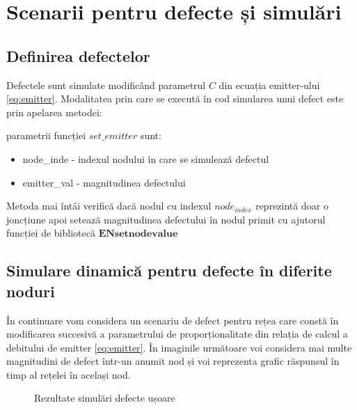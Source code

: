 \chapter{Scenarii pentru defecte și simulări}
\label{chap:detectie}
\section{Definirea defectelor}
Defectele sunt simulate modificând parametrul $C$ din ecuația emitter-ului \eqref{eq:emitter}. Modalitatea prin care se execută în cod simularea unui defect este prin apelarea metodei:



parametrii funcției $set\_emitter$ sunt:
\begin{itemize}
\item node\_inde - indexul nodului în care se simulează defectul
\item emitter\_val - magnitudinea defectului
\end{itemize}

Metoda mai întâi verifică dacă nodul cu indexul $node_{index}$ reprezintă doar o joncțiune apoi setează magnitudinea defectului în nodul primit cu ajutorul funcției de bibliotecă $\mathbf{ENsetnodevalue}$ 

\section{Simulare dinamică pentru defecte în diferite noduri}

În continuare vom considera un scenariu de defect pentru rețea care constă în modificarea succesivă a parametrului de proporționalitate din relația de calcul a debitului de emitter \eqref{eq:emitter}. În imaginile următoare voi considera mai multe magnitudini de defect într-un anumit nod și voi reprezenta grafic răspunsul în timp al rețelei în același nod.

\begin{figure}[H]

\qquad
{}

\caption{Rezultate simulări defecte ușoare}
\label{fig:ref_emitter_soft}
\end{figure}

